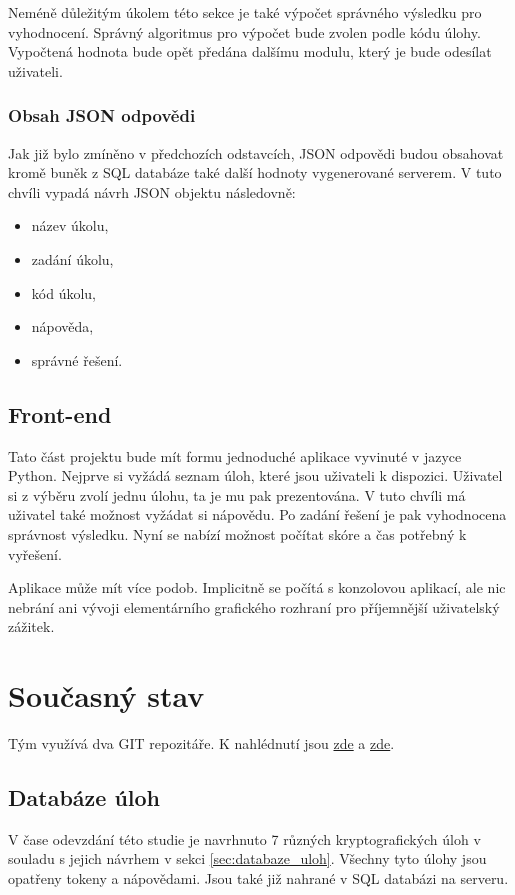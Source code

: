 \documentclass[titlepage]{article}
\begin{document}
Neméně důležitým úkolem této sekce je také výpočet správného výsledku pro vyhodnocení. Správný algoritmus pro výpočet bude zvolen podle kódu úlohy. Vypočtená hodnota bude opět předána dalšímu modulu, který je bude odesílat uživateli. 

\subsubsection{Obsah JSON odpovědi}\label{sec:obsa_json}
Jak již bylo zmíněno v předchozích odstavcích, JSON odpovědi budou obsahovat kromě buněk z SQL databáze také další hodnoty vygenerované serverem. V tuto chvíli vypadá návrh JSON objektu následovně:
\begin{itemize}
    \item název úkolu,
    \item zadání úkolu,
    \item kód úkolu,
    \item nápověda,
    \item správné řešení.
\end{itemize}


\subsection{Front-end}
Tato část projektu bude mít formu jednoduché aplikace vyvinuté v jazyce Python. Nejprve si vyžádá seznam úloh, které jsou uživateli k dispozici. Uživatel si z výběru zvolí jednu úlohu, ta je mu pak prezentována. V tuto chvíli má uživatel také možnost vyžádat si nápovědu. Po zadání řešení je pak vyhodnocena správnost výsledku. Nyní se nabízí možnost počítat skóre a čas potřebný k vyřešení. 

Aplikace může mít více podob. Implicitně se počítá s konzolovou aplikací, ale nic nebrání ani vývoji elementárního grafického rozhraní pro příjemnější uživatelský zážitek. 



\section{Současný stav}
Tým využívá dva GIT repozitáře. K nahlédnutí jsou \href{https://github.com/voytex/kry_gen}{zde} a \href{https://github.com/voytex/kry_gen-backend}{zde}.
\subsection{Databáze úloh}
V čase odevzdání této studie je navrhnuto 7 různých kryptografických úloh v souladu s jejich návrhem v sekci \ref{sec:databaze_uloh}. Všechny tyto úlohy jsou opatřeny tokeny  a nápovědami. Jsou také již nahrané v SQL databázi na serveru. 
\end{document}
